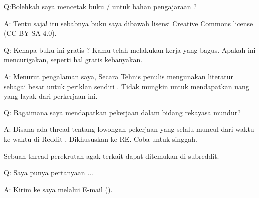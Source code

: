 \par Q:Bolehkah saya mencetak buku / untuk bahan pengajaraan ?
\par A: Tentu saja! itu sebabnya buku saya dibawah lisensi Creative Commons license (CC BY-SA 4.0).

\par Q: Kenapa buku ini gratis ? Kamu telah melakukan kerja yang bagus. Apakah ini mencurigakan, seperti hal gratis kebanyakan.
\par A: Menurut pengalaman saya, Secara Tehnis penulis mengunakan literatur sebagai besar untuk periklan sendiri . Tidak mungkin untuk mendapatkan uang yang layak dari perkerjaan ini.

\par Q: Bagaimana saya mendapatkan pekerjaan dalam bidang rekayasa mundur?
\par A: Disana ada thread tentang lowongan pekerjaan yang selalu muncul dari waktu ke waktu di Reddit , Dikhususkan ke RE\FNURLREDDIT{}.
Coba untuk singgah.

Sebuah thread perekrutan agak terkait dapat ditemukan di  subreddit.


\par Q: Saya punya pertanyaan ...
\par A: Kirim ke saya melalui E-mail (\EMAIL).
